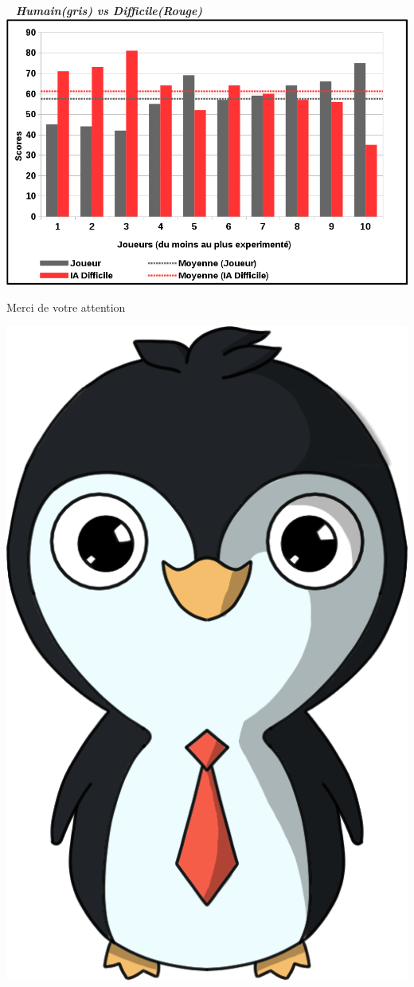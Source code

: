 \documentclass{beamer}
\begin{document}
\begin{frame}{}
\begin{center}
{
 \hspace*{2cm}~\tiny
 \textbf{\textit{Humain(gris) vs Difficile(Rouge)}}
 \newline
 \includegraphics[scale=0.40]{IA12}
}
\end{center}
\end{frame}

\begin{frame}
 \begin{center}
  \Huge Merci de votre attention
 \end{center}
 \begin{center}
  \includegraphics[scale=0.55]{pingouin}
 \end{center}
\end{frame}
\end{document}
